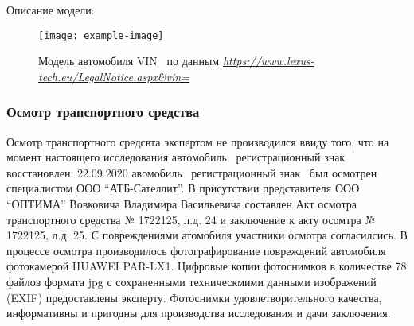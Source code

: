 Описание модели:
\begin{figure}[H]
	\centering
	\texttt{[image: example-image]}
	\caption[]{{\footnotesize Модель  автомобиля VIN \vin\, по данным\textit{ \url{https://www.lexus-tech.eu/LegalNotice.aspx\&vin=}}} }
	\label{fig:vin}
\end{figure}

\vspace{3mm}
%
%


\subsubsection{Осмотр транспортного средства}

Осмотр транспортного средсвта экспертом не производился ввиду того, что на момент настоящего исследования автомобиль  \, регистрационный знак  \, восстановлен.
22.09.2020 авомобиль  \, регистрационный знак \, был осмотрен специалистом ООО \enquote{АТБ-Сателлит}. В присутствии представителя ООО \enquote{ОПТИМА} Вовковича Владимира Васильевича составлен Акт осмотра  транспортного средства № 1722125, л.д. 24 и заключение к акту осомтра  № 1722125, л.д. 25. С повреждениями атомобиля участники осмотра согласилсись.  В процессе осмотра производилось фотографирование повреждений автомобиля \, фотокамерой HUAWEI PAR-LX1. Цифровые копии фотоснимков в количестве 78 файлов формата jpg  с сохраненными техническмими данными изображений (EXIF) предоставлены эксперту. Фотоснимки удовлетворительного качества, информативны и пригодны для производства исследования и дачи заключения.

